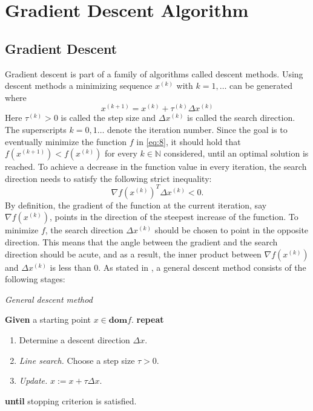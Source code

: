 \section{Gradient Descent Algorithm}\label{sec: GD}
\subsection{Gradient Descent}
Gradient descent is part of a family of algorithms called descent methods. Using descent methods a minimizing sequence $x^{(k)}$ with $k = 1,\ldots$ can be generated where $$x^{(k+1)} = x^{(k)} + \tau^{(k)} \Delta x^{(k)}$$ Here $\tau^{(k)} > 0$ is called the step size and $\Delta x^{(k)}$ is called the search direction. The superscripts $k=0,1\ldots$ denote the iteration number. Since the goal is to eventually minimize the function $f$ in \eqref{eq:8}, it should hold that $f(x^{(k+1)}) < f(x^{(k)})$ for every $k \in \mathbb{N}$ considered, until an optimal solution is reached. To achieve a decrease in the function value in every iteration, the search direction needs to satisfy the following strict inequality: $$\nabla f(x^{(k)})^{T} \Delta x^{(k)} < 0.$$ By definition, the gradient of the function at the current iteration, say $\nabla f(x^{(k)})$, points in the direction of the steepest increase of the function. To minimize $f$, the search direction $\Delta x^{(k)}$ should be chosen to point in the opposite direction. This means that the angle between the gradient and the search direction should be acute, and as a result, the inner product between $\nabla f(x^{(k)})$ and $\Delta x^{(k)}$ is less than 0. As stated in \cite[464]{boyd2004convex}, a general descent method consists of the following stages: 
\begin{algorithm}
\caption{\textit{General descent method}}
\begin{algorithmic}
\State \textbf{Given} a starting point $x \in \textbf{dom} f$.
\vspace{0.03cm}
\State \textbf{repeat}\\
\begin{enumerate}
    \item Determine a descent direction $\Delta x.$
    \item \textit{Line search.} Choose a step size $\tau > 0$.
    \item \textit{Update.} $x := x + \tau \Delta x.$
\end{enumerate}
\State \textbf{until} stopping criterion is satisfied.
\end{algorithmic}
\end{algorithm}\\
